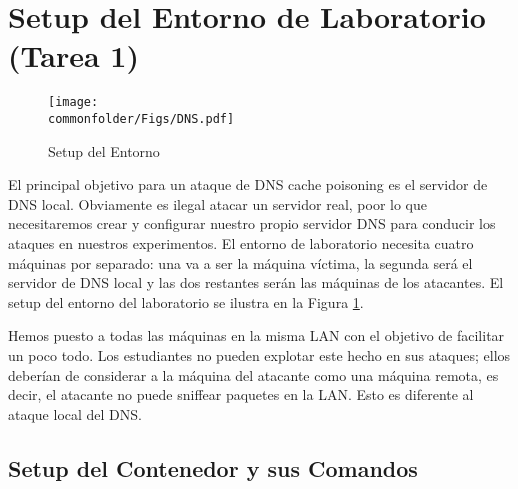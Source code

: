 \section{Setup del Entorno de Laboratorio (Tarea 1)}
\label{sec:environment}

\begin{figure}[htb]
\centering
\texttt{[image: \\commonfolder/Figs/DNS.pdf]}
\caption{Setup del Entorno}
\label{dns:fig:environment}
\end{figure}

El principal objetivo para un ataque de DNS cache poisoning es el servidor de DNS  local. Obviamente es ilegal atacar un servidor real, poor lo que necesitaremos crear y configurar nuestro propio servidor DNS para conducir los ataques en nuestros experimentos. El entorno de laboratorio necesita cuatro máquinas por separado:
una va a ser la máquina víctima, la segunda será el servidor de DNS local y las dos restantes serán las máquinas de los atacantes.
El setup del entorno del laboratorio se ilustra en la Figura \ref{dns:fig:environment}.


%

Hemos puesto a todas las máquinas en la misma LAN con el objetivo de facilitar un poco todo.
Los estudiantes no pueden explotar este hecho en sus ataques; ellos deberían de considerar a la máquina del atacante como una máquina remota, es decir, el atacante no puede sniffear paquetes en la LAN.
Esto es diferente al ataque local del DNS.


\subsection{Setup del Contenedor y sus Comandos}


